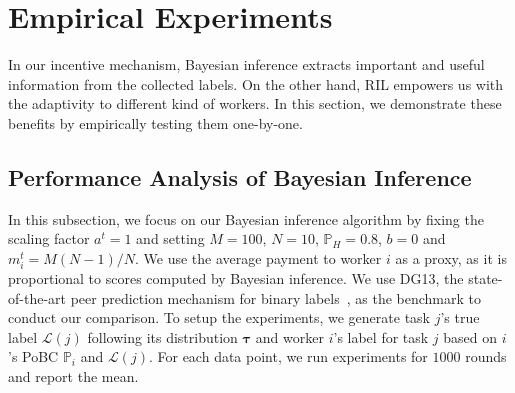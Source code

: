 \section{Empirical Experiments} 
In our incentive mechanism, Bayesian inference extracts important and useful information from the collected labels. On the other hand, RIL empowers us with the adaptivity to different kind of workers. In this section, we demonstrate these benefits by empirically testing them one-by-one.


\subsection{Performance Analysis of Bayesian Inference}
In this subsection, we focus on our Bayesian inference algorithm by fixing the scaling factor $a^t=1$ and setting $M=100$, $N=10$, $\mathbb{P}_H=0.8$, $b=0$ and $m_i^t=M(N-1)/N$. 
We use the average payment to worker $i$ as a proxy, as it is proportional to scores computed by Bayesian inference. We use DG13, the state-of-the-art peer prediction mechanism for binary labels~\citep{dasgupta2013crowdsourced}, as the benchmark to conduct our comparison. To setup the experiments, we generate task $j$'s true label $\mathcal{L}(j)$ following its distribution $\bm{\tau}$ and worker $i$'s label for task $j$ based on $i$'s PoBC $\mathbb{P}_i$ and $\mathcal{L}(j)$. For each data point, we run experiments for $1000$ rounds and report the mean.

